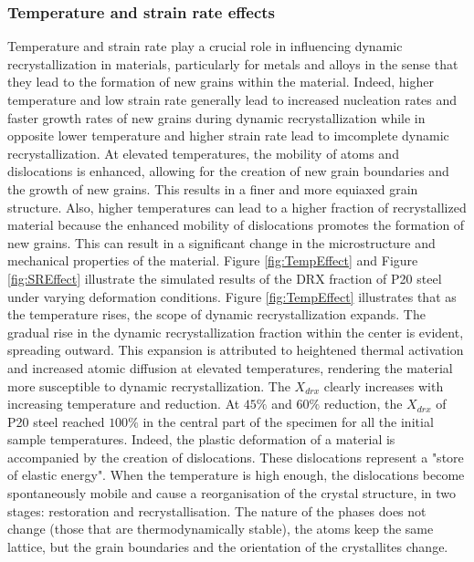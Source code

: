 \documentclass[metals,article,submit,pdftex,moreauthors]{Definitions/mdpi}
\begin{document}
\subsubsection{Temperature and strain rate effects \label{subsec:TempSReffect}}

Temperature and strain rate play a crucial role in influencing dynamic recrystallization in materials, particularly for metals and alloys in the sense that they lead to the formation of new grains within the material. Indeed, higher temperature and low strain rate generally lead to increased nucleation rates and faster growth rates of new grains during dynamic recrystallization while in opposite lower temperature and higher strain rate lead to imcomplete dynamic recrystallization. At elevated temperatures, the mobility of atoms and dislocations is enhanced, allowing for the creation of new grain boundaries and the growth of new grains. This results in a finer and more equiaxed grain structure. Also, higher temperatures can lead to a higher fraction of recrystallized material because the enhanced mobility of dislocations promotes the formation of new grains. This can result in a significant change in the microstructure and mechanical properties of the material. Figure \ref{fig:TempEffect} and Figure \ref{fig:SREffect} illustrate the simulated results of the DRX fraction of P20 steel under varying deformation conditions. Figure \ref{fig:TempEffect} illustrates that as the temperature rises, the scope of dynamic recrystallization expands. The gradual rise in the dynamic recrystallization fraction within the center is evident, spreading outward. This expansion is attributed to heightened thermal activation and increased atomic diffusion at elevated temperatures, rendering the material more susceptible to dynamic recrystallization. The $X_{drx}$ clearly increases with increasing temperature and reduction. At $45\%$ and $60\%$ reduction, the $X_{drx}$ of P20 steel
reached $100\%$ in the central part of the specimen for all the initial sample temperatures. Indeed, the plastic deformation of a material is accompanied by the creation of dislocations. These dislocations represent a "store of elastic energy". When the temperature is high enough, the dislocations become spontaneously mobile and cause a reorganisation of the crystal structure, in two stages: restoration and recrystallisation. The nature of the phases does not change (those that are thermodynamically stable), the atoms keep the same lattice, but the grain boundaries and the orientation of the crystallites change.
\end{document}
